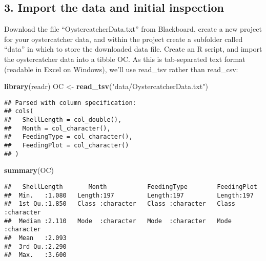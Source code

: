 \documentclass[]{article}
\newenvironment{Shaded}{\begin{snugshade}}{\end{snugshade}}
\newcommand{\KeywordTok}[1]{\textcolor[rgb]{0.13,0.29,0.53}{\textbf{#1}}}
\newcommand{\StringTok}[1]{\textcolor[rgb]{0.31,0.60,0.02}{#1}}
\newcommand{\CommentTok}[1]{\textcolor[rgb]{0.56,0.35,0.01}{\textit{#1}}}
\newcommand{\OperatorTok}[1]{\textcolor[rgb]{0.81,0.36,0.00}{\textbf{#1}}}
\newcommand{\NormalTok}[1]{#1}
\begin{document}
\subsection{3. Import the data and initial
inspection}\label{import-the-data-and-initial-inspection}

Download the file ``OystercatcherData.txt'' from Blackboard, create a
new project for your oystercatcher data, and within the project create a
subfolder called ``data'' in which to store the downloaded data file.
Create an R script, and import the oystercatcher data into a tibble OC.
As this is tab-separated text format (readable in Excel on Windows),
we'll use read\_tsv rather than read\_csv:

\begin{Shaded}
\begin{Highlighting}[]
\KeywordTok{library}\NormalTok{(readr)}
\NormalTok{OC <-}\StringTok{ }\KeywordTok{read_tsv}\NormalTok{(}\StringTok{"data/OystercatcherData.txt"}\NormalTok{)}
\end{Highlighting}
\end{Shaded}

\begin{verbatim}
## Parsed with column specification:
## cols(
##   ShellLength = col_double(),
##   Month = col_character(),
##   FeedingType = col_character(),
##   FeedingPlot = col_character()
## )
\end{verbatim}

\begin{Shaded}
\begin{Highlighting}[]
\KeywordTok{summary}\NormalTok{(OC)}
\end{Highlighting}
\end{Shaded}

\begin{verbatim}
##   ShellLength       Month           FeedingType        FeedingPlot       
##  Min.   :1.080   Length:197         Length:197         Length:197        
##  1st Qu.:1.850   Class :character   Class :character   Class :character  
##  Median :2.110   Mode  :character   Mode  :character   Mode  :character  
##  Mean   :2.093                                                           
##  3rd Qu.:2.290                                                           
##  Max.   :3.600
\end{verbatim}

\begin{Shaded}
\end{Shaded}
\end{document}
